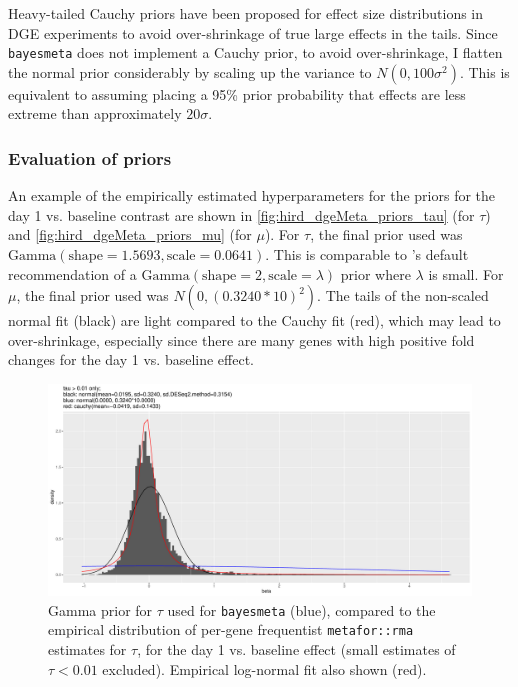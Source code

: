 Heavy-tailed Cauchy priors have been proposed for effect size distributions in \gls{DGE} experiments to avoid over-shrinkage of true large effects in the tails\autocite{zhu2019HeavytailedPriorDistributions}.
Since \texttt{bayesmeta} does not implement a Cauchy prior, to avoid over-shrinkage, I flatten the normal prior considerably by scaling up the variance to $N(0, 100\sigma^2)$.
This is equivalent to assuming placing a 95\% prior probability that effects are less extreme than approximately $20\sigma$.

\subsubsection{Evaluation of priors}

An example of the empirically estimated hyperparameters for the priors for the day 1 vs. baseline contrast are shown in \autoref{fig:hird_dgeMeta_priors_tau} (for $\tau$) and \autoref{fig:hird_dgeMeta_priors_mu} (for $\mu$).
For $\tau$, the final prior used was $\text{Gamma}(\text{shape}=1.5693, \text{scale}=0.0641)$.
This is comparable to \autocite{chung2013NondegeneratePenalizedLikelihood}'s default recommendation of a $\text{Gamma}(\text{shape}=2, \text{scale}=\lambda)$ prior where $\lambda$ is small.
For $\mu$, the final prior used was $N(0, (0.3240*10)^2)$.
The tails of the non-scaled normal fit (black) are light compared to the Cauchy fit (red), which may lead to over-shrinkage, especially since there are many genes with high positive fold changes for the day 1 vs. baseline effect.

\begin{figure}
    \includegraphics[width=1.0\textwidth,page=2]{mainmatter/figures/chapter_02/meta.bayesmeta.priors.coefName_d1.vs.d0.pdf}
    \caption{Gamma prior for $\tau$ used for \texttt{bayesmeta} (blue), compared to the empirical distribution of per-gene frequentist \texttt{metafor::rma} estimates for $\tau$, for the day 1 vs. baseline effect (small estimates of $\tau < 0.01$ excluded). Empirical log-normal fit also shown (red).}
    \label{fig:hird_dgeMeta_priors_tau}
\end{figure}

